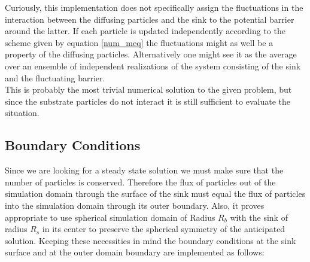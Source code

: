 Curiously, this implementation does not specifically assign the fluctuations in the interaction between the diffusing particles and the sink to the potential barrier around the latter. If each particle is updated independently according to the scheme given by equation \ref{num_meq} the fluctuations might as well be a property of the diffusing particles. Alternatively one might see it as the average over an ensemble of independent realizations of the system consisting of the sink and the fluctuating barrier. \\

This is probably the most trivial numerical solution to the given problem, but since the substrate particles do not interact it is still sufficient to evaluate the situation.

\subsection{Boundary Conditions}
Since we are looking for a steady state solution we must make sure that the number of particles is conserved. Therefore the flux of particles out of the simulation domain through the surface of the sink must equal the flux of particles into the simulation domain through its outer boundary.
Also, it proves appropriate to use spherical simulation domain of Radius $R_b$ with the sink of radius $R_s$ in its center to preserve the spherical symmetry of the anticipated solution.
Keeping these necessities in mind the boundary conditions at the sink surface and at the outer domain boundary are implemented as follows: \\
